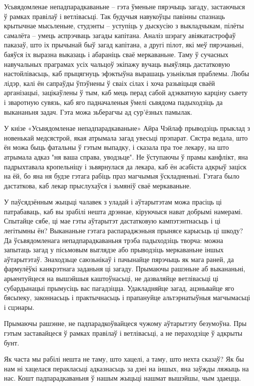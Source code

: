 Усьвядомленае непадпарадкаваньне – гэта ўменьне пярэчыць загаду, застаючыся ў рамках правілаў і ветлівасьці. Так будучыя навукоўцы павінны спазнаць крытычнае мысьленьне, студэнты – уступіць у дыскусію з выкладчыкам, пілёты самалёта – умець аспрэчваць загады капітана. Аналіз шэрагу авіякатастрофаў паказаў, што іх прычынай быў загад капітана, а другі пілот, які меў пярэчаньні, баяўся іх выразна выказаць і абараніць сваё меркаваньне. Таму ў сучасных навучальных праграмах усіх чальцоў экіпажу вучаць выяўляць дастатковую настойлівасьць, каб прыцягнуць эфэктыўна вырашаць узьніклыя праблемы. Любы лідэр, калі ён сапраўды ўпэўнены ў сваіх сілах і хоча разьвіцьця сваёй арганізацыі, зацікаўлены ў тым, каб мець перад сабой адэкватную карціну сьвету і зваротную сувязь, каб яго падначаленыя ўмелі сьвядома падыходзіць да выкананьня задач. Гэта можа зьберагчы ад сур'ёзных памылак.

У кнізе «Усьвядомленае непадпарадкаваньне» Айра Чэйлаф прыводзіць прыклад з новенькай медсястрой, якая атрымала загад увесьці прэпарат. Сястра ведала, што ён можа быць фатальны ў гэтым выпадку, і сказала пра тое лекару, на што атрымала адказ "ня ваша справа, уводзьце". Не ўступаючы ў прамы канфлікт, яна падрыхтавала кропельніцу і зьвярнулася да лекара, каб ён асабіста адкрыў заціск на ёй, бо яна ня будзе гэтага рабіць праз магчымыя ўскладненьні. Гэтага было дастаткова, каб лекар прыслухаўся і зьмяніў сваё меркаваньне. 

У паўсядзённым жыцьці чалавек з уладай і аўтарытэтам можа прасіць ці патрабаваць, каб вы зрабілі нешта дрэннае, кіруючыся нават добрымі намерамі. Спытайце сябе, ці мае гэты аўтарытэт дастатковую кампэтэнтнасьць і ці легітымны ён? Выкананьне гэтага распараджэньня прынясе карысьць ці шкоду? Да ўсьвядомленага непадпарадкаваньня трэба падыходзіць творча: можна запытаць загад у пісьмовым выглядзе або прыводзіць меркаваньне іншых аўтарытэтаў. Знаходзьце саюзьнікаў і пачынайце пярэчыць як мага раней, да фармулёўкі канкрэтнага заданьня ці загаду. Прымаючы рашэньне аб выкананьні, арыентуйцеся на вышэйшыя каштоўнасьці, не дазваляйце ветлівасьці ці субардынацыі прымусіць вас пагадзіцца. Удакладняйце загад, ацэньвайце яго бясьпеку, законнасьць і практычнасьць і прапануйце альтэрнатыўныя магчымасьці і сцэнары.

Прымаючы рашэнне, не падпарадкоўвайцеся чужому аўтарытэту безумоўна. Пры гэтым заставайцеся ў рамках правілаў і ветлівасьці, а не пераходзіце ў адкрыты бунт.

Як часта мы рабілі нешта не таму, што хацелі, а таму, што нехта сказаў? Як бы нам ні хацелася перакласьці адказнасьць за дзеі на іншых, яна заўжды ляжыць на нас. Кошт падпарадкаваньня ў нашым жыцьці нашмат вышэйшы, чым здаецца.

